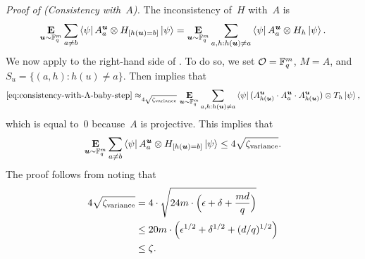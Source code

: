 \vspace{\baselineskip}
\noindent
\emph{Proof of  (Consistency with~$A$).}
The inconsistency of~$H$ with~$A$ is
\begin{equation}\label{eq:consistency-with-A-baby-step}
\mathop{\bf E\/}_{\boldsymbol{u} \sim \mathbb F_q^m} \sum_{a \neq b} \bra{\psi} A^{\boldsymbol{u}}_a \otimes H_{[h(\boldsymbol{u}) = b]} \ket{\psi}
= \mathop{\bf E\/}_{\boldsymbol{u} \sim \mathbb F_q^m} \sum_{a, h: h(\boldsymbol{u}) \neq a} \bra{\psi} A^{\boldsymbol{u}}_a \otimes H_h \ket{\psi}.
\end{equation}
We now apply  to the right-hand side of .
To do so, we set $\mathcal{O} = \mathbb F_q^m$, $M = A$, and $S_u = \{(a, h) : h(u) \neq a\}$.
Then  implies that
\begin{equation*}
\eqref{eq:consistency-with-A-baby-step}
\approx_{4 \sqrt{\zeta_{\mathrm{variance}}}}
\mathop{\bf E\/}_{\boldsymbol{u} \sim \mathbb F_q^m} \sum_{a, h: h(\boldsymbol{u}) \neq a} \bra{\psi} (A^{\boldsymbol{u}}_{h(\boldsymbol{u})} \cdot A^{\boldsymbol{u}}_a  \cdot A^{\boldsymbol{u}}_{h(\boldsymbol{u})})\otimes T_h \ket{\psi},
\end{equation*}
which is equal to~$0$ because~$A$ is projective.
This implies that
\begin{equation}\label{eq:explicit-bound-for-A-consistency}
\mathop{\bf E\/}_{\boldsymbol{u} \sim \mathbb F_q^m} \sum_{a \neq b} \bra{\psi} A^{\boldsymbol{u}}_a \otimes H_{[h(\boldsymbol{u}) = b]} \ket{\psi} \leq 4 \sqrt{\zeta_{\mathrm{variance}}}.
\end{equation}
The proof follows from noting that
\begin{align*}
4\sqrt{\zeta_{\mathrm{variance}}}
&= 4 \cdot \sqrt{24 m \cdot\Big(\epsilon + \delta + \frac{md}{q}\Big)}\\
&\leq 20 m \cdot \Big(\epsilon^{1/2} + \delta^{1/2} + (d/q)^{1/2}\Big)\\
&\leq \zeta.
\end{align*}

